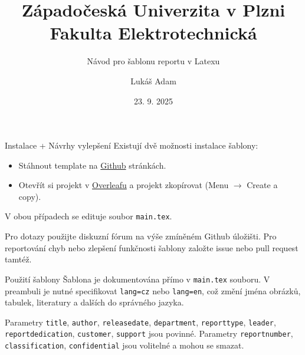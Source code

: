 \documentclass[11pt, aspectratio=169]{beamer}
\title[]{Západočeská Univerzita v Plzni \\ Fakulta Elektrotechnická}
\author{Lukáš Adam}
\date{23. 9. 2025}
\subtitle{Návod pro šablonu reportu v Latexu}
\begin{document}
\begin{frame}
	\maketitle
\end{frame}



\begin{frame}{Instalace + Návrhy vylepšení}
Existují dvě možnosti instalace šablony:
\begin{itemize}
\item Stáhnout template na \href{https://github.com/sadda/uwb-fee-report}{Github} stránkách.
\item Otevřít si projekt v \href{https://www.overleaf.com/read/nhmrwnfykqpf\#940003}{Overleafu} a projekt zkopírovat (Menu $\rightarrow$ Create a copy).
\end{itemize}
V obou případech se edituje soubor \texttt{main.tex}.

\vspace{5mm}

Pro dotazy použijte diskuzní fórum na výše zmíněném Github úložišti. Pro reportování chyb nebo zlepšení funkčnosti šablony založte issue nebo pull request tamtéž.
\end{frame}



\begin{frame}{Použití šablony}
Šablona je dokumentována přímo v \texttt{main.tex} souboru. V preambuli je nutné specifikovat \texttt{lang=cz} nebo \texttt{lang=en}, což změní jména obrázků, tabulek, literatury a dalších do správného jazyka.

\vspace{5mm}

Parametry \texttt{title}, \texttt{author}, \texttt{releasedate}, \texttt{department}, \texttt{reporttype}, \texttt{leader}, \texttt{reportdedication}, \texttt{customer}, \texttt{support} jsou povinné. Parametry \texttt{reportnumber}, \texttt{classification}, \texttt{confidential} jsou volitelné a mohou se smazat.
\end{frame}

\begin{frame}
\end{frame}
\end{document}
